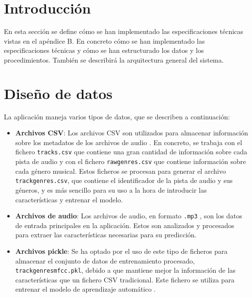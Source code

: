 
\section{Introducción}

En esta sección se define cómo se han implementado las especificaciones técnicas vistas en el apéndice B. En concreto 
cómo se han implementado las especificaciones técnicas y cómo se han estructurado los datos y los procedimientos. 
También se describirá la arquitectura general del sistema.

\section{Diseño de datos}

La aplicación maneja varios tipos de datos, que se describen a continuación:

\begin{itemize}
\tightlist

\item \textbf{Archivos CSV}: Los archivos CSV son utilizados para almacenar información sobre los metadatos de los archivos de audio \cite{CSV_documentation}.
En concreto, se trabaja con el fichero \texttt{tracks.csv} que contiene una gran cantidad de información sobre cada pista de audio y con el fichero \texttt{raw\textunderscore genres.csv} que contiene información sobre cada género musical.
Estos ficheros se procesan para generar el archivo \texttt{track\textunderscore genres.csv}, que contiene el identificador de la pista de audio y sus géneros, y es más sencillo para su uso a la hora de introducir las características y entrenar el modelo.

\item \textbf{Archivos de audio}: Los archivos de audio, en formato \texttt{.mp3} \cite{MP3}, son los datos de entrada principales en la aplicación. Estos son analizados y procesados para extraer las características necesarias para su predicción.

\item \textbf{Archivos pickle}: Se ha optado por el uso de este tipo de ficheros para almacenar el conjunto de datos de entrenamiento procesado, \texttt{track\textunderscore genres\textunderscore mfcc.pkl}, debido a que mantiene mejor la información de las características que un fichero CSV tradicional.
Este fichero se utiliza para entrenar el modelo de aprendizaje automático \cite{Selvaraj_2023}.

\end{itemize}

